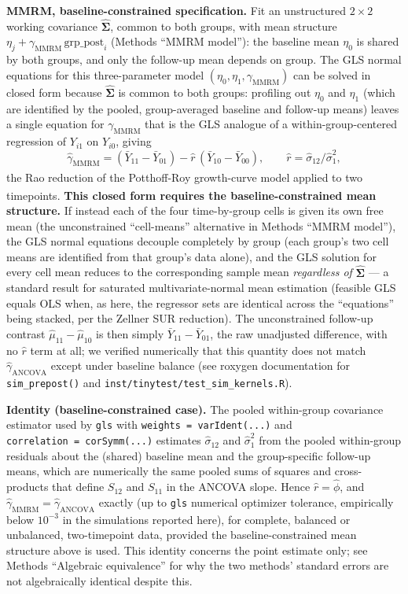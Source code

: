 \documentclass[
  11pt,
]{article}
\begin{document}
\textbf{MMRM, baseline-constrained specification.} Fit an
unstructured \(2 \times 2\) working covariance
\(\hat{\mathbf\Sigma}\), common to both groups, with mean
structure \(\eta_j + \gamma_{\mathrm{MMRM}}\,
\mathrm{grp\_post}_i\) (Methods ``MMRM model''): the baseline
mean \(\eta_0\) is shared by both groups, and only the
follow-up mean depends on group. The GLS normal equations
for this three-parameter model
\((\eta_0, \eta_1, \gamma_{\mathrm{MMRM}})\) can be solved in
closed form because \(\hat{\mathbf\Sigma}\) is common to both
groups: profiling out \(\eta_0\) and \(\eta_1\) (which are
identified by the pooled, group-averaged baseline and
follow-up means) leaves a single equation for
\(\gamma_{\mathrm{MMRM}}\) that is the GLS analogue of a
within-group-centered regression of \(Y_{i1}\) on \(Y_{i0}\),
giving
\[
\hat{\gamma}_{\mathrm{MMRM}} =
(\bar{Y}_{11} - \bar{Y}_{01}) -
\hat{r}\,(\bar{Y}_{10} - \bar{Y}_{00}), \qquad
\hat{r} = \hat\sigma_{12} / \hat\sigma_1^2,
\]
the Rao reduction of the Potthoff-Roy growth-curve model\textsuperscript{} applied to two timepoints\textsuperscript{}. \textbf{This closed form requires the
baseline-constrained mean structure.} If instead each of
the four time-by-group cells is given its own free mean
(the unconstrained ``cell-means'' alternative in Methods
``MMRM model''), the GLS normal equations decouple
completely by group (each group's two cell means are
identified from that group's data alone), and the GLS
solution for every cell mean reduces to the corresponding
sample mean \emph{regardless of} \(\hat{\mathbf\Sigma}\) --- a
standard result for saturated multivariate-normal mean
estimation (feasible GLS equals OLS when, as here, the
regressor sets are identical across the ``equations'' being
stacked, per the Zellner SUR reduction). The unconstrained
follow-up contrast \(\hat\mu_{11} - \hat\mu_{10}\) is then
simply \(\bar{Y}_{11} - \bar{Y}_{01}\), the raw
unadjusted difference, with no \(\hat r\) term at all; we
verified numerically that this quantity does not match
\(\hat{\gamma}_{\mathrm{ANCOVA}}\) except under baseline
balance (see roxygen documentation for \texttt{sim\_prepost()} and
\texttt{inst/tinytest/test\_sim\_kernels.R}).

\textbf{Identity (baseline-constrained case).} The pooled
within-group covariance estimator used by \texttt{gls} with
\texttt{weights\ =\ varIdent(...)} and \texttt{correlation\ =\ corSymm(...)} estimates \(\hat\sigma_{12}\) and
\(\hat\sigma_1^2\) from the pooled within-group residuals
about the (shared) baseline mean and the group-specific
follow-up means, which are numerically the same pooled
sums of squares and cross-products that define \(S_{12}\)
and \(S_{11}\) in the ANCOVA slope. Hence \(\hat{r} =
\hat\phi\), and \(\hat{\gamma}_{\mathrm{MMRM}} =
\hat{\gamma}_{\mathrm{ANCOVA}}\) exactly (up to \texttt{gls}
numerical optimizer tolerance, empirically below \(10^{-3}\)
in the simulations reported here), for complete,
balanced or unbalanced, two-timepoint data, provided the
baseline-constrained mean structure above is used. This
identity concerns the point estimate only; see Methods
``Algebraic equivalence'' for why the two methods' standard
errors are not algebraically identical despite this.
\end{document}
